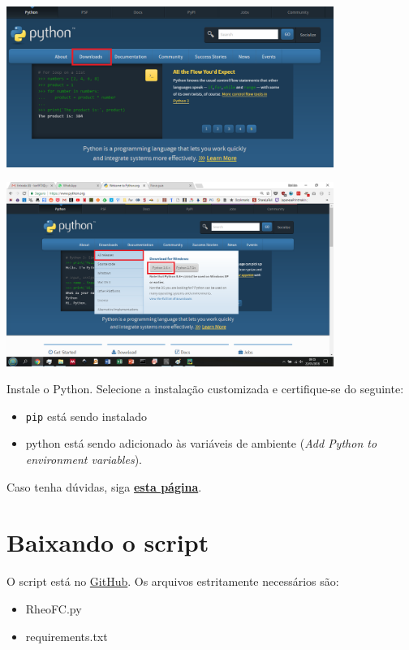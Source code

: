 \documentclass[a4paper, 12pt]{article}
\begin{document}
\begin{center}
\includegraphics[width = 0.8\textwidth]{Pyt1}
\end{center}

\begin{center}
\includegraphics[width = 0.8\textwidth]{Pyt2}
\end{center}

Instale o Python. Selecione a instalação customizada e certifique-se do seguinte:

\begin{itemize}
\item \texttt{pip} está sendo instalado
\item python está sendo adicionado às variáveis de ambiente (\emph{Add Python to environment variables}).
\end{itemize}

Caso tenha dúvidas, siga \href{https://docs.python.org/3/using/windows.html}{\textbf{esta página}}.

\section{Baixando o script}

O script está no \href{https://github.com/KarlClinckspoor/Rheology}{GitHub}. Os arquivos estritamente necessários são:

\begin{itemize}
\item RheoFC.py
\item requirements.txt
\end{itemize}
\end{document}
